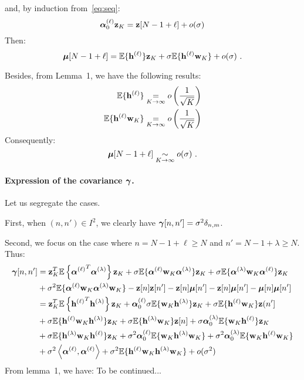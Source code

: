 \documentclass[journal, onecolumn]{IEEEtran}
\begin{document}
and, by induction from~\eqref{eq:seq}:
\begin{equation}
\label{eq:alpha0z.sine}
\balpha_0^{(\ell)}\bz_{K} = \bz[N-1+\ell] + o(\sigma)
\end{equation}
Then:
\begin{equation*}
\boldsymbol{\mu}[N-1+\ell] = {\mathbb E}\{{\mathbf h}^{(\ell)}\}{\mathbf z}_{K} + \sigma{\mathbb E}\{{\mathbf h}^{(\ell)}{\mathbf w}_{K}\} + o(\sigma)\ .
\end{equation*}
{\color{blue}
Besides, from Lemma~1, we have the following results:
\begin{align*}
{\mathbb E}\{{\mathbf h}^{(\ell)}\} &\underset{K\to\infty}{=} o\left(\dfrac1{\sqrt{K}}\right)\\
{\mathbb E}\{{\mathbf h}^{(\ell)}{\mathbf w}_{K}\} &\underset{K\to\infty}{=} o\left(\dfrac1{\sqrt{K}}\right)
\end{align*}
Consequently:
\begin{equation*}
\boldsymbol{\mu}[N-1+\ell] \underset{K\to\infty}{\sim} o(\sigma)\ .
\end{equation*}


\paragraph{Expression of the covariance $\boldsymbol{\gamma}$.}
Let us segregate the cases.

First, when $(n,n')\in I^2$, we clearly have $\boldsymbol{\gamma}[n,n']=\sigma^2\delta_{n,m}$. 

Second, we focus on the case where $n=N-1+\ell\geq N$ and $n'=N-1+\lambda\geq N$. Thus:
\begin{align*}  
\boldsymbol{\gamma}[n,n'] &= {\mathbf z}_K^T{\mathbb E}\left\{{\boldsymbol{\alpha}^{(\ell)}}^T\boldsymbol{\alpha}^{(\lambda)}\right\}{\mathbf z}_K + \sigma{\mathbb E}\{\boldsymbol{\alpha}^{(\ell)}{\mathbf w}_K\boldsymbol{\alpha}^{(\lambda)}\}{\mathbf z}_K+ \sigma{\mathbb E}\{\boldsymbol{\alpha}^{(\lambda)}{\mathbf w}_K\boldsymbol{\alpha}^{(\ell)}\}{\mathbf z}_K \\
& +\sigma^2{\mathbb E}\{\boldsymbol{\alpha}^{(\ell)}{\mathbf w}_K\boldsymbol{\alpha}^{(\lambda)}{\mathbf w}_K\}-{\mathbf z}[n]{\mathbf z}[n']-{\mathbf z}[n]\boldsymbol{\mu}[n']-{\mathbf z}[n]\boldsymbol{\mu}[n'] - \boldsymbol{\mu}[n]\boldsymbol{\mu}[n'] \\
&= {\mathbf z}_K^T{\mathbb E}\left\{{{\mathbf h}^{(\ell)}}^T{\mathbf h}^{(\lambda)}\right\}{\mathbf z}_K + \boldsymbol{\alpha}_0^{(\ell)}\sigma{\mathbb E}\{{\mathbf w}_K{\mathbf h}^{(\lambda)}\}{\mathbf z}_K + \sigma{\mathbb E}\{{\mathbf h}^{(\ell)}{\mathbf w}_K\}{\mathbf z}(n']  \\
&+ \sigma{\mathbb E}\{{\mathbf h}^{(\ell)}{\mathbf w}_K{\mathbf h}^{(\lambda)}\}{\mathbf z}_K+ \sigma{\mathbb E}\{{\mathbf h}^{(\lambda)}{\mathbf w}_K\}{\mathbf z}[n] + \sigma\boldsymbol{\alpha}_0^{(\lambda)}{\mathbb E}\{{\mathbf w}_K{\mathbf h}^{(\ell)}\}{\mathbf z}_K \\
& + \sigma{\mathbb E}\{{\mathbf h}^{(\lambda)}{\mathbf w}_K{\mathbf h}^{(\ell)}\}{\mathbf z}_K+\sigma^2\boldsymbol{\alpha}_0^{(\ell)}{\mathbb E}\{{\mathbf w}_K{\mathbf h}^{(\lambda)}{\mathbf w}_K\}+\sigma^2\boldsymbol{\alpha}_0^{(\lambda)}{\mathbb E}\{{\mathbf w}_K{\mathbf h}^{(\ell)}{\mathbf w}_K\} \\
&+\sigma^2\left\langle\boldsymbol{\alpha}^{(\ell)},\boldsymbol{\alpha}^{(\ell)}\right\rangle +\sigma^2{\mathbb E}\{{\mathbf h}^{(\ell)}{\mathbf w}_K{\mathbf h}^{(\lambda)}{\mathbf w}_K\} + o(\sigma^2)
\end{align*}
From lemma~1, we have:
To be continued...

}
\end{document}

